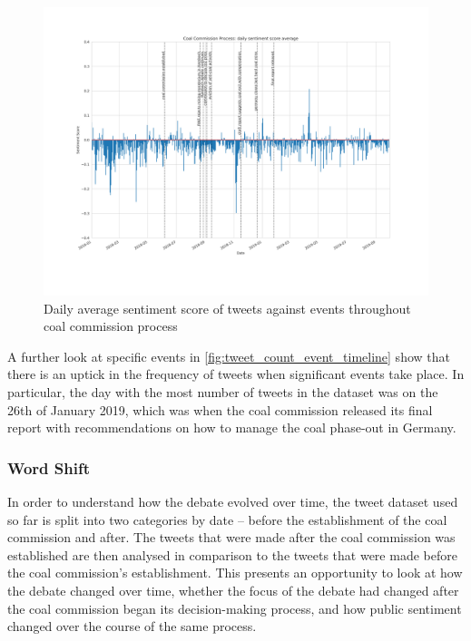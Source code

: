 \documentclass[10pt,twocolumn,twoside,lineno]{pnas-new}
\begin{document}
\begin{figure} 
	\begin{center}
		\includegraphics[width=\linewidth]{figures/tweet_score_event_timeline}
	\end{center}
	\caption{Daily average sentiment score of tweets against events throughout coal commission process}
	\label{fig:tweet_score_event_timeline}
\end{figure}

A further look at specific events in \ref{fig:tweet_count_event_timeline} show that there is an uptick in the frequency of tweets when significant events take place. In particular, the day with the most number of tweets in the dataset was on the 26th of January 2019, which was when the coal commission released its final report with recommendations on how to manage the coal phase-out in Germany. 

\subsubsection*{Word Shift}
In order to understand how the debate evolved over time, the tweet dataset used so far is split into two categories by date -- before the establishment of the coal commission and after. The tweets that were made after the coal commission was established are then analysed in comparison to the tweets that were made before the coal commission's establishment. This presents an opportunity to look at how the debate changed over time, whether the focus of the debate had changed after the coal commission began its decision-making process, and how public sentiment changed over the course of the same process. 
\end{document}
